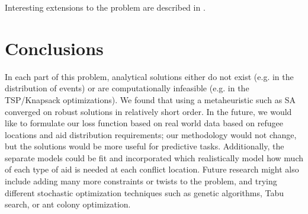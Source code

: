 \documentclass{article} %
\begin{document}
\begin{multicols}{2}
Interesting extensions to the problem are described in \cite{Gavish1978}.

\section*{Conclusions}

In each part of this problem, analytical solutions either do not exist (e.g. in the distribution of events) or are computationally infeasible (e.g. in the TSP/Knapsack optimizations).  We found that using a metaheuristic such as SA converged on robust solutions in relatively short order. In the future, we would like to formulate our loss function based on real world data based on refugee locations and aid distribution requirements; our methodology would not change, but the solutions would be more useful for predictive tasks. Additionally, the separate models could be fit and incorporated which realistically model how much of each type of aid is needed at each conflict location. Future research might also include adding many more constraints or twists to the problem, and trying different stochastic optimization techniques such as genetic algorithms, Tabu search, or ant colony optimization.



\end{multicols}
\end{document}
